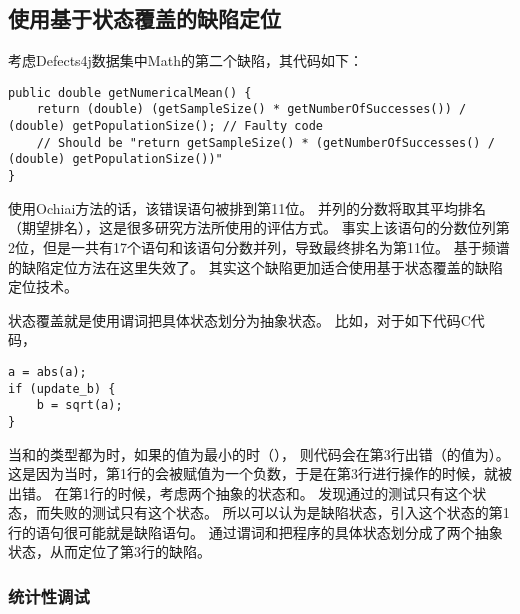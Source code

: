 \subsection{使用基于状态覆盖的缺陷定位}
\label{sec:state_based}

考虑Defects4j数据集中Math的第二个缺陷，其代码如下：
\lstset{language=Java}
\begin{lstlisting}
public double getNumericalMean() {
    return (double) (getSampleSize() * getNumberOfSuccesses()) / (double) getPopulationSize(); // Faulty code
    // Should be "return getSampleSize() * (getNumberOfSuccesses() / (double) getPopulationSize())"
}
\end{lstlisting}

使用Ochiai方法的话，该错误语句被排到第11位。
并列的分数将取其平均排名（期望排名），这是很多研究方法所使用的评估方式\parencite{Keller2017Evaluating,Xuan2014Learning,Steimann2013Threats,Wong2016A}。
事实上该语句的分数位列第2位，但是一共有17个语句和该语句分数并列，导致最终排名为第11位。
基于频谱的缺陷定位方法在这里失效了。
其实这个缺陷更加适合使用基于状态覆盖的缺陷定位技术。

状态覆盖就是使用谓词把具体状态划分为抽象状态。
比如，对于如下代码C代码，
\lstset{language=C}
\begin{lstlisting}
a = abs(a);
if (update_b) {
    b = sqrt(a);
}
\end{lstlisting}
当和的类型都为时，如果的值为最小的时（），
则代码会在第3行出错（的值为）。
这是因为当时，第1行的会被赋值为一个负数，于是在第3行进行操作的时候，就被出错。
在第1行的时候，考虑两个抽象的状态和。
发现通过的测试只有这个状态，而失败的测试只有这个状态。
所以可以认为是缺陷状态，引入这个状态的第1行的语句很可能就是缺陷语句。
通过谓词和把程序的具体状态划分成了两个抽象状态，从而定位了第3行的缺陷。

\subsubsection{统计性调试}

